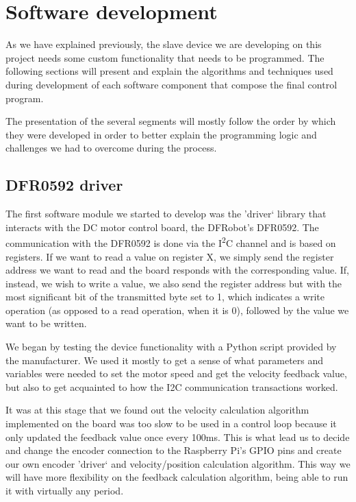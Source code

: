 \section{Software development} \label{sec:software-devel}
As we have explained previously, the slave device we are developing on this project needs some custom functionality that needs to be programmed.
The following sections will present and explain the algorithms and techniques used during development of each software component that compose the final control program.

The presentation of the several segments will mostly follow the order by which they were developed in order to better explain the programming logic and challenges we had to overcome during the process.

\subsection{DFR0592 driver}
The first software module we started to develop was the 'driver` library that interacts with the DC motor control board, the DFRobot's DFR0592.
The communication with the DFR0592 is done via the I\textsuperscript{2}C channel and is based on registers.
If we want to read a value on register X, we simply send the register address we want to read and the board responds with the corresponding value.
If, instead, we wish to write a value, we also send the register address but with the most significant bit of the transmitted byte set to 1, which indicates a write operation (as opposed to a read operation, when it is 0), followed by the value we want to be written.

We began by testing the device functionality with a Python \cite{sw:python} script provided by the manufacturer.
We used it mostly to get a sense of what parameters and variables were needed to set the motor speed and get the velocity feedback value, but also to get acquainted to how the I2C communication transactions worked.

It was at this stage that we found out the velocity calculation algorithm implemented on the board was too slow to be used in a control loop because it only updated the feedback value once every 100ms.
This is what lead us to decide and change the encoder connection to the Raspberry Pi's GPIO pins and create our own encoder 'driver` and velocity/position calculation algorithm.
This way we will have more flexibility on the feedback calculation algorithm, being able to run it with virtually any period.

